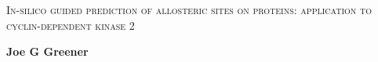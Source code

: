 \documentclass[12pt]{report}
\begin{document}
\begin{titlepage}
\thispagestyle{plain}
{\scshape\Large In-silico guided prediction of allosteric sites on proteins: application to cyclin-dependent kinase 2\par}
\vspace{1.5cm}
{\huge\bfseries Joe G Greener\par}
\end{titlepage}

\onehalfspacing



\setcounter{page}{3}


\tableofcontents

\listoffigures

\listoftables















\singlespacing

\begin{small}
\renewcommand{\bibname}{References}


\end{small}
\end{document}
